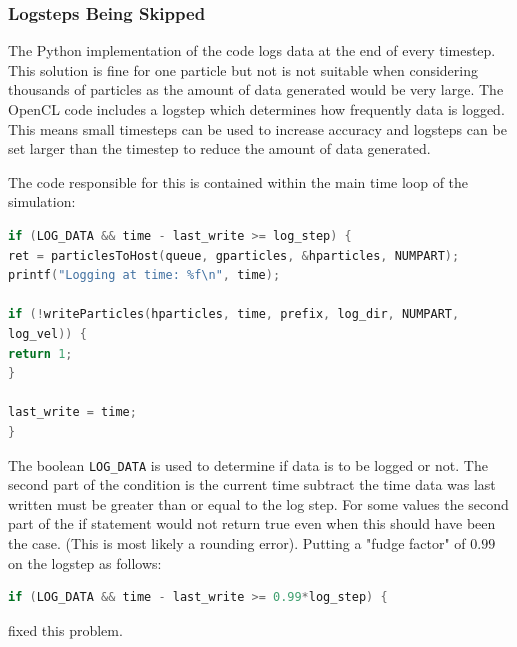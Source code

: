 \documentclass[../Interim_Report_Master]{subfiles}
\begin{document}
\subsubsection{Logsteps Being Skipped}
The Python implementation of the code logs data at the end of every timestep. This solution is fine for one particle but not is not suitable when considering thousands of particles as the amount of data generated would be very large. The OpenCL code includes a logstep which determines how frequently data is logged. This means small timesteps can be used to increase accuracy and logsteps can be set larger than the timestep to reduce the amount of data generated.

The code responsible for this is contained within the main time loop of the simulation:
\begin{lstlisting}[frame=single, language=C]
if (LOG_DATA && time - last_write >= log_step) {
ret = particlesToHost(queue, gparticles, &hparticles, NUMPART);
printf("Logging at time: %f\n", time);

if (!writeParticles(hparticles, time, prefix, log_dir, NUMPART, 
log_vel)) {
return 1;
}

last_write = time;
}
\end{lstlisting}

The boolean \lstinline[language=c, columns=fixed]|LOG_DATA| is used to determine if data is to be logged or not. The second part of the condition is the current time subtract the time data was last written must be greater than or equal to the log step. For some values the second part of the if statement would not return true even when this should have been the case. (This is most likely a rounding error). Putting a "fudge factor" of $0.99$ on the logstep as follows:
\begin{lstlisting}[frame=single, language=C]
if (LOG_DATA && time - last_write >= 0.99*log_step) {
\end{lstlisting}
fixed this problem. 
\end{document}
